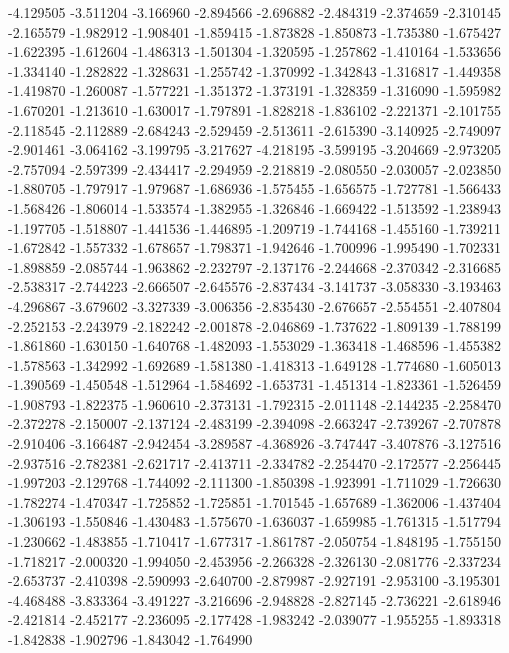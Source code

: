 -4.129505
-3.511204
-3.166960
-2.894566
-2.696882
-2.484319
-2.374659
-2.310145
-2.165579
-1.982912
-1.908401
-1.859415
-1.873828
-1.850873
-1.735380
-1.675427
-1.622395
-1.612604
-1.486313
-1.501304
-1.320595
-1.257862
-1.410164
-1.533656
-1.334140
-1.282822
-1.328631
-1.255742
-1.370992
-1.342843
-1.316817
-1.449358
-1.419870
-1.260087
-1.577221
-1.351372
-1.373191
-1.328359
-1.316090
-1.595982
-1.670201
-1.213610
-1.630017
-1.797891
-1.828218
-1.836102
-2.221371
-2.101755
-2.118545
-2.112889
-2.684243
-2.529459
-2.513611
-2.615390
-3.140925
-2.749097
-2.901461
-3.064162
-3.199795
-3.217627
-4.218195
-3.599195
-3.204669
-2.973205
-2.757094
-2.597399
-2.434417
-2.294959
-2.218819
-2.080550
-2.030057
-2.023850
-1.880705
-1.797917
-1.979687
-1.686936
-1.575455
-1.656575
-1.727781
-1.566433
-1.568426
-1.806014
-1.533574
-1.382955
-1.326846
-1.669422
-1.513592
-1.238943
-1.197705
-1.518807
-1.441536
-1.446895
-1.209719
-1.744168
-1.455160
-1.739211
-1.672842
-1.557332
-1.678657
-1.798371
-1.942646
-1.700996
-1.995490
-1.702331
-1.898859
-2.085744
-1.963862
-2.232797
-2.137176
-2.244668
-2.370342
-2.316685
-2.538317
-2.744223
-2.666507
-2.645576
-2.837434
-3.141737
-3.058330
-3.193463
-4.296867
-3.679602
-3.327339
-3.006356
-2.835430
-2.676657
-2.554551
-2.407804
-2.252153
-2.243979
-2.182242
-2.001878
-2.046869
-1.737622
-1.809139
-1.788199
-1.861860
-1.630150
-1.640768
-1.482093
-1.553029
-1.363418
-1.468596
-1.455382
-1.578563
-1.342992
-1.692689
-1.581380
-1.418313
-1.649128
-1.774680
-1.605013
-1.390569
-1.450548
-1.512964
-1.584692
-1.653731
-1.451314
-1.823361
-1.526459
-1.908793
-1.822375
-1.960610
-2.373131
-1.792315
-2.011148
-2.144235
-2.258470
-2.372278
-2.150007
-2.137124
-2.483199
-2.394098
-2.663247
-2.739267
-2.707878
-2.910406
-3.166487
-2.942454
-3.289587
-4.368926
-3.747447
-3.407876
-3.127516
-2.937516
-2.782381
-2.621717
-2.413711
-2.334782
-2.254470
-2.172577
-2.256445
-1.997203
-2.129768
-1.744092
-2.111300
-1.850398
-1.923991
-1.711029
-1.726630
-1.782274
-1.470347
-1.725852
-1.725851
-1.701545
-1.657689
-1.362006
-1.437404
-1.306193
-1.550846
-1.430483
-1.575670
-1.636037
-1.659985
-1.761315
-1.517794
-1.230662
-1.483855
-1.710417
-1.677317
-1.861787
-2.050754
-1.848195
-1.755150
-1.718217
-2.000320
-1.994050
-2.453956
-2.266328
-2.326130
-2.081776
-2.337234
-2.653737
-2.410398
-2.590993
-2.640700
-2.879987
-2.927191
-2.953100
-3.195301
-4.468488
-3.833364
-3.491227
-3.216696
-2.948828
-2.827145
-2.736221
-2.618946
-2.421814
-2.452177
-2.236095
-2.177428
-1.983242
-2.039077
-1.955255
-1.893318
-1.842838
-1.902796
-1.843042
-1.764990
